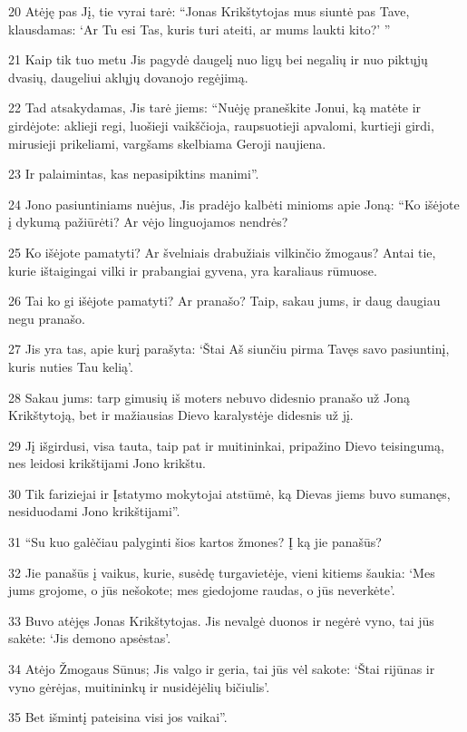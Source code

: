 \par 20 Atėję pas Jį, tie vyrai tarė: “Jonas Krikštytojas mus siuntė pas Tave, klausdamas: ‘Ar Tu esi Tas, kuris turi ateiti, ar mums laukti kito?’ ” 
\par 21 Kaip tik tuo metu Jis pagydė daugelį nuo ligų bei negalių ir nuo piktųjų dvasių, daugeliui aklųjų dovanojo regėjimą. 
\par 22 Tad atsakydamas, Jis tarė jiems: “Nuėję praneškite Jonui, ką matėte ir girdėjote: aklieji regi, luošieji vaikščioja, raupsuotieji apvalomi, kurtieji girdi, mirusieji prikeliami, vargšams skelbiama Geroji naujiena. 
\par 23 Ir palaimintas, kas nepasipiktins manimi”. 
\par 24 Jono pasiuntiniams nuėjus, Jis pradėjo kalbėti minioms apie Joną: “Ko išėjote į dykumą pažiūrėti? Ar vėjo linguojamos nendrės? 
\par 25 Ko išėjote pamatyti? Ar švelniais drabužiais vilkinčio žmogaus? Antai tie, kurie ištaigingai vilki ir prabangiai gyvena, yra karaliaus rūmuose. 
\par 26 Tai ko gi išėjote pamatyti? Ar pranašo? Taip, sakau jums, ir daug daugiau negu pranašo. 
\par 27 Jis yra tas, apie kurį parašyta: ‘Štai Aš siunčiu pirma Tavęs savo pasiuntinį, kuris nuties Tau kelią’. 
\par 28 Sakau jums: tarp gimusių iš moters nebuvo didesnio pranašo už Joną Krikštytoją, bet ir mažiausias Dievo karalystėje didesnis už jį. 
\par 29 Jį išgirdusi, visa tauta, taip pat ir muitininkai, pripažino Dievo teisingumą, nes leidosi krikštijami Jono krikštu. 
\par 30 Tik fariziejai ir Įstatymo mokytojai atstūmė, ką Dievas jiems buvo sumanęs, nesiduodami Jono krikštijami”. 
\par 31 “Su kuo galėčiau palyginti šios kartos žmones? Į ką jie panašūs? 
\par 32 Jie panašūs į vaikus, kurie, susėdę turgavietėje, vieni kitiems šaukia: ‘Mes jums grojome, o jūs nešokote; mes giedojome raudas, o jūs neverkėte’. 
\par 33 Buvo atėjęs Jonas Krikštytojas. Jis nevalgė duonos ir negėrė vyno, tai jūs sakėte: ‘Jis demono apsėstas’. 
\par 34 Atėjo Žmogaus Sūnus; Jis valgo ir geria, tai jūs vėl sakote: ‘Štai rijūnas ir vyno gėrėjas, muitininkų ir nusidėjėlių bičiulis’. 
\par 35 Bet išmintį pateisina visi jos vaikai”. 
